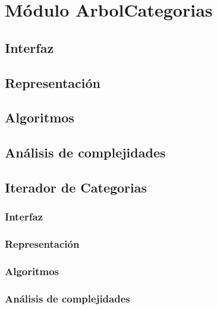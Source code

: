 \documentclass[12pt, a4paper]{article}
\begin{document}
\section{Módulo ArbolCategorias} 
\subsection{Interfaz}

\subsection{Representaci\'on}

\subsection{Algoritmos}

\subsection{Análisis de complejidades}

\newpage

\subsection{Iterador de Categorias} 
\subsubsection{Interfaz}

\subsubsection{Representaci\'on}

\subsubsection{Algoritmos}

\subsubsection{Análisis de complejidades}

\newpage
\end{document}
